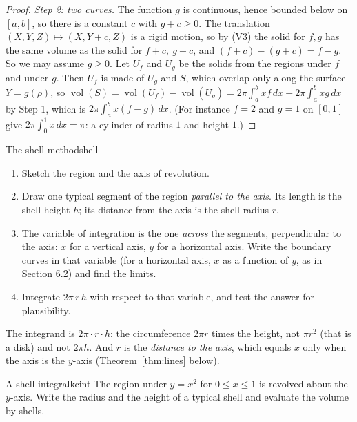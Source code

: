 \documentclass[11pt]{article}
\begin{document}
\begin{proof}
\emph{Step 2: two curves.} The function $g$ is continuous, hence bounded below on $[a,b]$, so there is a constant $c$ with $g+c\ge0$. The translation $(X,Y,Z)\mapsto(X,Y+c,Z)$ is a rigid motion, so by (V3) the solid for $f,g$ has the same volume as the solid for $f+c,\ g+c$, and $(f+c)-(g+c)=f-g$. So we may assume $g\ge0$. Let $U_f$ and $U_g$ be the solids from the regions under $f$ and under $g$. Then $U_f$ is made of $U_g$ and $S$, which overlap only along the surface $Y=g(\rho)$, so $\operatorname{vol}(S)=\operatorname{vol}(U_f)-\operatorname{vol}(U_g)=2\pi\int_a^bxf\,dx-2\pi\int_a^bxg\,dx$ by Step 1, which is $2\pi\int_a^bx(f-g)\,dx$. (For instance $f=2$ and $g=1$ on $[0,1]$ give $2\pi\int_0^1x\,dx=\pi$: a cylinder of radius $1$ and height $1$.)
\end{proof}

\begin{proc}{The shell method}{shell}
\begin{enumerate}[nosep]
  \item Sketch the region and the axis of revolution.
  \item Draw one typical segment of the region \emph{parallel to the axis}. Its length is the shell height $h$; its distance from the axis is the shell radius $r$.
  \item The variable of integration is the one \emph{across} the segments, perpendicular to the axis: $x$ for a vertical axis, $y$ for a horizontal axis. Write the boundary curves in that variable (for a horizontal axis, $x$ as a function of $y$, as in Section 6.2) and find the limits.
  \item Integrate $2\pi\,r\,h$ with respect to that variable, and test the answer for plausibility.
\end{enumerate}
\end{proc}

\begin{warn}
The integrand is $2\pi\cdot r\cdot h$: the circumference $2\pi r$ times the height, not $\pi r^2$ (that is a disk) and not $2\pi h$. And $r$ is the \emph{distance to the axis}, which equals $x$ only when the axis is the $y$-axis (Theorem~\ref{thm:lines} below).
\end{warn}

\begin{kc}{A shell integral}{kcint}
The region under $y=x^2$ for $0\le x\le1$ is revolved about the $y$-axis. Write the radius and the height of a typical shell and evaluate the volume by shells.
\end{kc}
\end{document}
